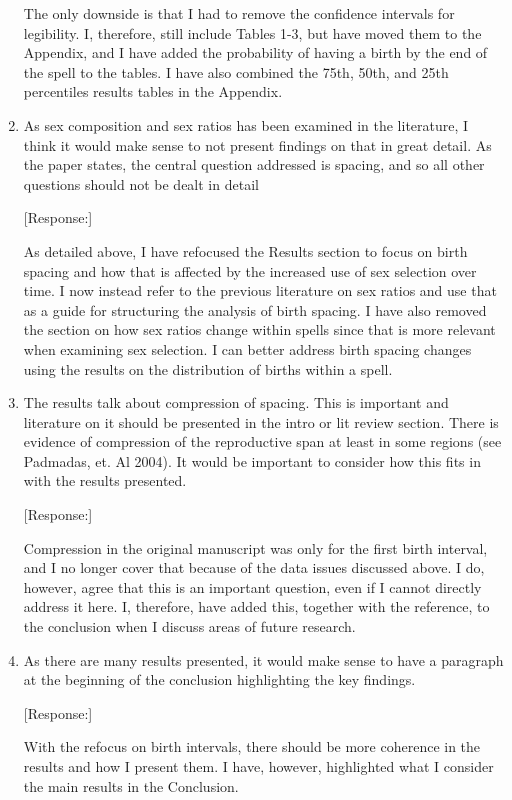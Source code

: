 \documentclass[letterpaper,12pt]{article}
\begin{document}
\begin{enumerate}
The only downside is that I had to remove the confidence intervals for legibility. 
I, therefore, still include Tables 1-3, but have moved them to the Appendix, and I have 
added the probability of having a birth by the end of the spell to the tables.
I have also combined the 75th, 50th, and 25th percentiles results tables in the Appendix.

\item As sex composition and sex ratios has been examined in the literature, I think
it would make sense to not present findings on that in great detail. As
the paper states, the central question addressed is spacing, and so all
other questions should not be dealt in detail

[Response:]

As detailed above, I have refocused the Results section to focus on birth spacing and how 
that is affected by the increased use of sex selection over time.
I now instead refer to the previous literature on sex ratios and use that as a guide for
structuring the analysis of birth spacing.
I have also removed the section on how sex ratios change within spells since that is
more relevant when examining sex selection.
I can better address birth spacing changes using the results on the distribution of 
births within a spell.


\item The results talk about compression of spacing. This is important and
literature on it should be presented in the intro or lit review section.
There is evidence of compression of the reproductive span at least in
some regions (see Padmadas, et. Al 2004). It would be important to
consider how this fits in with the results presented.

[Response:]

Compression in the original manuscript was only for the first birth interval, and I no longer 
cover that because of the data issues discussed above.
I do, however, agree that this is an important question, even if I cannot directly
address it here.
I, therefore, have added this, together with the reference, to the conclusion when I 
discuss areas of future research.


\item As there are many results presented, it would make sense to have a
paragraph at the beginning of the conclusion highlighting the key
findings.

[Response:]

With the refocus on birth intervals, there should be more coherence in the results and
how I present them.
I have, however, highlighted what I consider the main results in the Conclusion.




\end{enumerate}
\end{document}

